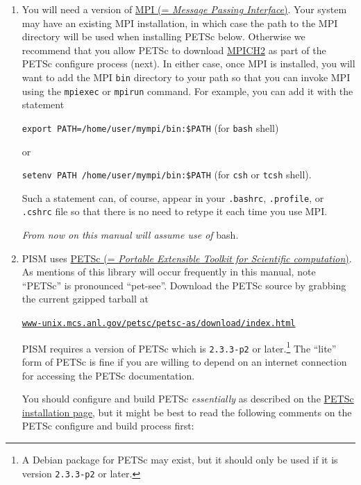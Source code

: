 \documentclass[11pt,final]{amsart}
\newcommand{\PETSCREV}{2.3.3-p2}
\renewcommand{\t}[1]{\texttt{#1}}
\begin{document}
\begin{enumerate}
\item You will need a version of \href{http://www-unix.mcs.anl.gov/mpi/}{MPI (= \emph{Message Passing Interface})}.  Your system may have an existing MPI installation, in which case the path to the MPI directory will be used when installing PETSc below.  Otherwise we recommend that you allow PETSc to download \href{http://www-unix.mcs.anl.gov/mpi/mpich2/}{MPICH2} as part of the PETSc configure process (next).  In either case, once MPI is installed, you will want to add the MPI \verb|bin| directory to your path so that you can invoke MPI using the \verb|mpiexec| or \verb|mpirun| command.  For example, you can add it with the statement

\verb|export PATH=/home/user/mympi/bin:$PATH|  \qquad (for \verb|bash| shell)

\noindent or

\verb|setenv PATH /home/user/mympi/bin:$PATH|  \qquad (for \verb|csh| or \verb|tcsh| shell).

\noindent Such a statement can, of course, appear in your \verb|.bashrc|, \verb|.profile|, or \verb|.cshrc| file so that there is no need to retype it each time you use MPI.

\medskip
\centerline{\emph{From now on this manual will assume use of} bash.}
\medskip

\item PISM uses   \href{http://www-unix.mcs.anl.gov/petsc/petsc-2/index.html}{PETSc (= \emph{Portable Extensible Toolkit for Scientific computation})}.  As mentions of this library will occur frequently in this manual, note ``PETSc'' is pronounced ``pet-see''.  Download the PETSc source by grabbing the current gzipped tarball at  
   \centerline{\href{http://www-unix.mcs.anl.gov/petsc/petsc-as/download/index.html}{\t{www-unix.mcs.anl.gov/petsc/petsc-as/download/index.html}}}
PISM requires a version of PETSc which is \texttt{\PETSCREV} or later.\footnote{A Debian package for PETSc may exist, but it should only be used if it is version \texttt{\PETSCREV} or later.}   The ``lite'' form of PETSc is fine if you are willing to depend on an internet connection for accessing the PETSc documentation. 

You should configure and build PETSc \emph{essentially} as described on the  \href{http://www-unix.mcs.anl.gov/petsc/petsc-2/documentation/installation.html}{PETSc installation page}, but it might be best to read the following comments on the PETSc configure and build process first:


\end{enumerate}
\end{document}
